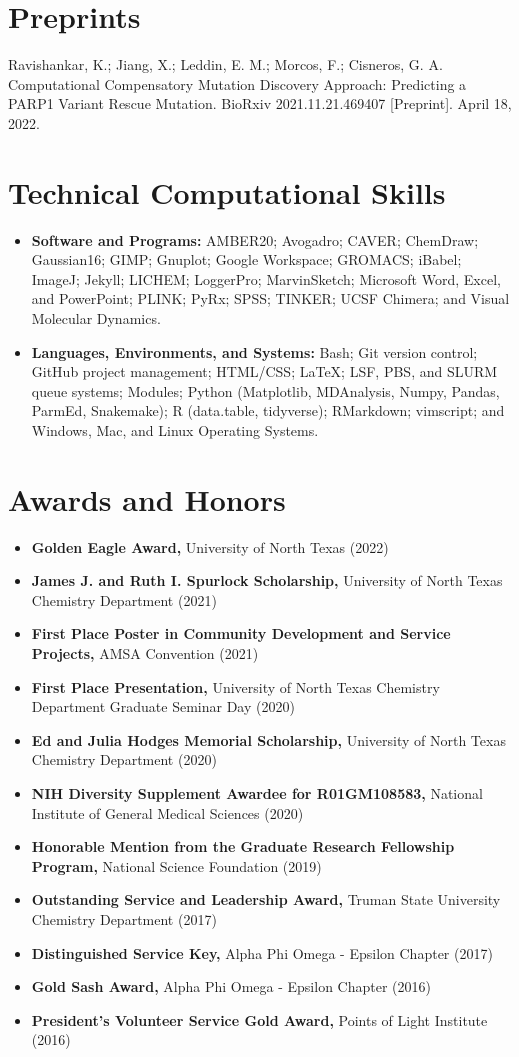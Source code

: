 \documentclass[letterpaper,11pt]{article}
\newcommand{\resumeItem}[2]{
  \item
    \textbf{#1}{ #2 \vspace{-2pt}}
}
\newcommand{\commaSubItem}[2]{\resumeItem{#1\textnormal{,}} {#2}\vspace{-4pt}}
\newcommand{\positionSubItem}[2]{\resumeItem{#1\textnormal{:}} {#2}\vspace{-4pt}}
\newcommand{\resumeSubHeadingListStart}{\begin{itemize}[leftmargin=*]}
\newcommand{\resumeSubHeadingListEnd}{\end{itemize}}
\begin{document}
\section{Preprints}
\begin{etaremune}
\item Ravishankar, K.; Jiang, X.; Leddin, E. M.; Morcos, F.; Cisneros, G. A.
Computational Compensatory Mutation Discovery Approach: Predicting a PARP1 Variant Rescue Mutation.
BioRxiv 2021.11.21.469407 [Preprint]. April 18, 2022. 
\end{etaremune}


\section{Technical Computational Skills}
  \resumeSubHeadingListStart
    \positionSubItem{Software and Programs}
      {AMBER20; Avogadro; CAVER; ChemDraw; Gaussian16; GIMP; Gnuplot; Google Workspace; GROMACS; iBabel; ImageJ; Jekyll; LICHEM; LoggerPro; MarvinSketch; Microsoft Word, Excel, and PowerPoint; PLINK; PyRx; SPSS; TINKER; UCSF Chimera; and Visual Molecular Dynamics.}
      \positionSubItem{Languages, Environments, and Systems}
      {Bash; Git version control; GitHub project management; HTML/CSS; \LaTeX; LSF, PBS, and SLURM queue systems; Modules; Python (Matplotlib, MDAnalysis, Numpy, Pandas, ParmEd, Snakemake); R (data.table, tidyverse); RMarkdown; vimscript; and Windows, Mac, and Linux Operating Systems.}
\resumeSubHeadingListEnd

\section{Awards and Honors}
  \resumeSubHeadingListStart
   \commaSubItem{Golden Eagle Award}
      {University of North Texas (2022)}
   \commaSubItem{James J. and Ruth I. Spurlock Scholarship}
      {University of North Texas Chemistry Department (2021)}
   \commaSubItem{First Place Poster in Community Development and Service Projects}
      {AMSA Convention (2021)}
   \commaSubItem{First Place Presentation}
      {University of North Texas Chemistry Department Graduate Seminar Day (2020)}
   \commaSubItem{Ed and Julia Hodges Memorial Scholarship}
      {University of North Texas Chemistry Department (2020)}
   \commaSubItem{NIH Diversity Supplement Awardee for R01GM108583}
      {National Institute of General Medical Sciences (2020)}
   \commaSubItem{Honorable Mention from the Graduate Research Fellowship Program}
      {National Science Foundation (2019)}
    \commaSubItem{Outstanding Service and Leadership Award}
      {Truman State University Chemistry Department (2017)}
    \commaSubItem{Distinguished Service Key}
      {Alpha Phi Omega - Epsilon Chapter (2017)}
    \commaSubItem{Gold Sash Award}
      {Alpha Phi Omega - Epsilon Chapter (2016)}
    \commaSubItem{President's Volunteer Service Gold Award}
      {Points of Light Institute (2016)}
  \resumeSubHeadingListEnd
\end{document}
